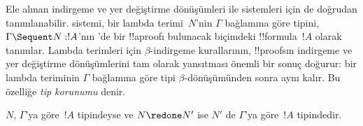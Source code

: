 \documentclass[../../../include/open-logic-section]{subfiles}
\begin{document}


Ele alınan indirgeme ve yer değiştirme dönüşümleri  ile
 sistemleri için de doğrudan tanımlanabilir.  sistemi,
bir lambda terimi~$N$'nin $\Gamma$ bağlamına göre tipini, $\Gamma \Sequent
N : !A$'nın 'de bir !!a{proof}{}ı bulunacak biçimdeki
!!{formula}~$!A$ olarak tanımlar. Lambda terimleri için $\beta$-indirgeme
kurallarının, !!{proof}s{}ın indirgeme ve yer değiştirme dönüşümlerini tam
olarak yansıtması önemli bir sonuç doğurur: bir lambda teriminin $\Gamma$
bağlamına göre tipi $\beta$-dönüşümünden sonra aynı kalır. Bu özelliğe
\emph{tip korunumu} denir.

\begin{prop}
$N$, $\Gamma$'ya göre~$!A$ tipindeyse ve $N \redone N'$ ise $N'$ de
$\Gamma$'ya göre~$!A$ tipindedir.
\end{prop}
\end{document}
